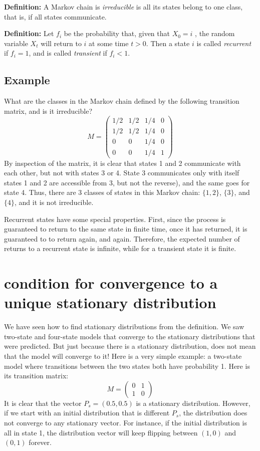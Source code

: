 \documentclass[11pt]{book}
\begin{document}
\textbf{Definition:} A Markov chain is \emph{irreducible} is all its states belong to one class, that is, if all states communicate.

\textbf{Definition:} Let $f_i$ be the probability that, given that  $X_0 = i$ , the random variable $X_t$ will return to $i$ at some time $t > 0$. Then a state $i$ is called \emph{recurrent} if $f_i =1 $, and is called \emph{transient} if $f_i  < 1$.

\subsection{Example}
What are the classes in the Markov chain defined by the following transition matrix, and is it irreducible?
$$M = \left(\begin{array}{cccc}1/2 & 1/2 & 1/4 & 0 \\ 1/2 & 1/2 & 1/4 & 0 \\ 0 & 0 & 1/4 & 0 \\ 0 & 0 & 1/4 & 1\end{array}\right)$$
By inspection of the matrix, it is clear that states 1 and 2 communicate with each other, but not with states 3 or 4. State 3 communicates only with itself states 1 and 2 are accessible from 3, but not the reverse), and the same goes for state 4. Thus, there are 3 classes of states in this Markov chain: $\{1, 2\}$, $\{3\}$, and $\{4\}$, and it is not irreducible.

Recurrent states have some special properties. First, since the process is guaranteed to return to the same state in finite time, once it has returned, it is guaranteed to to return again, and again. Therefore, the expected number of returns to a recurrent state is infinite, while for a transient state it is finite.

\section{condition for convergence to a unique stationary distribution}
We have seen how to find stationary distributions from the definition. We saw two-state and four-state models that converge to the stationary distributions that were predicted. But just because there is a stationary distribution, does not mean that the model will converge to it! Here is a very simple example: a two-state model where transitions between the two states both have probability 1. Here is its transition matrix:
$$ M = \left(\begin{array}{cc}0  & 1 \\ 1& 0\end{array}\right)$$
It is clear that the vector $P_s = (0.5, 0.5)$ is a stationary distribution. However, if we start with an initial distribution that is different $P_s$, the distribution does not converge to any stationary vector. For instance, if the initial distribution is all in state 1, the distribution vector will keep flipping between $(1,0)$ and $(0,1)$ forever.
\end{document}

